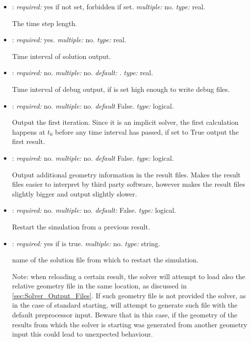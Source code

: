 \begin{itemize}
\item {}: \textit{required:} yes if  not set, forbidden if set. 
\textit{multiple:} no. \textit{type:} real.

The time step length.

\item {}: \textit{required:} yes. \textit{multiple:} no. \textit{type:} real.

Time interval of solution output.

\item {}: \textit{required:} no. \textit{multiple:} no. \textit{default:} 
. \textit{type:} real.

Time interval of debug output, if  is set high enough to write debug 
files.


\item {}: \textit{required:} no. \textit{multiple:} no. 
\textit{default} False. \textit{type:} logical.

Output the first iteration. Since it is an implicit solver, the first calculation happens 
at $t_0$ before any time interval has passed, if set to True output the first result.

\item {}: \textit{required:} no. \textit{multiple:} no. 
\textit{default} False. \textit{type:} logical.

Output additional geometry information in the result files. Makes the result files 
easier to interpret by third party software, however makes the result files slightly 
bigger and output slightly slower.

\item {}: \textit{required:} no. \textit{multiple:} no. 
\textit{default:} False. \textit{type:} logical.

Restart the simulation from a previous result.


\item {}: \textit{required:} yes if  
is true. \textit{multiple:} no. \textit{type:} string.

name of the solution file from which to restart the simulation.

Note: when reloading a certain result, the solver will attempt to load also the 
relative geometry file in the same location, as discussed in \ref{sec:Solver_Output_Files}. 
If such geometry file is not provided the solver, as in the case of standard starting, 
will attempt to generate such file with the default preprocessor input. Beware that in 
this case, if the geometry of the results from which the solver is starting was generated 
from another geometry input this could lead to unexpected behaviour.



\end{itemize}

